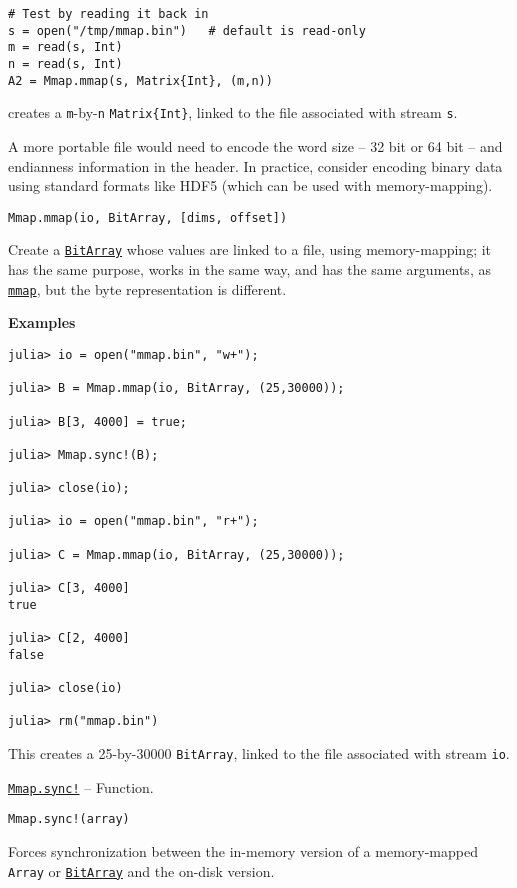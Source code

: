 \begin{adjustwidth}{2em}{0pt}
\begin{verbatim}
# Test by reading it back in
s = open("/tmp/mmap.bin")   # default is read-only
m = read(s, Int)
n = read(s, Int)
A2 = Mmap.mmap(s, Matrix{Int}, (m,n))
\end{verbatim}

creates a \texttt{m}-by-\texttt{n} \texttt{Matrix\{Int\}}, linked to the file associated with stream \texttt{s}.

A more portable file would need to encode the word size – 32 bit or 64 bit – and endianness information in the header. In practice, consider encoding binary data using standard formats like HDF5 (which can be used with memory-mapping).




\begin{lstlisting}
Mmap.mmap(io, BitArray, [dims, offset])
\end{lstlisting}

Create a \hyperlink{18015155802543401629}{\texttt{BitArray}} whose values are linked to a file, using memory-mapping; it has the same purpose, works in the same way, and has the same arguments, as \hyperlink{1028440884226576897}{\texttt{mmap}}, but the byte representation is different.

\textbf{Examples}


\begin{verbatim}
julia> io = open("mmap.bin", "w+");

julia> B = Mmap.mmap(io, BitArray, (25,30000));

julia> B[3, 4000] = true;

julia> Mmap.sync!(B);

julia> close(io);

julia> io = open("mmap.bin", "r+");

julia> C = Mmap.mmap(io, BitArray, (25,30000));

julia> C[3, 4000]
true

julia> C[2, 4000]
false

julia> close(io)

julia> rm("mmap.bin")
\end{verbatim}

This creates a 25-by-30000 \texttt{BitArray}, linked to the file associated with stream \texttt{io}.



\end{adjustwidth}
\hypertarget{10364432000624675045}{} 
\hyperlink{10364432000624675045}{\texttt{Mmap.sync!}}  -- {Function.}

\begin{adjustwidth}{2em}{0pt}


\begin{verbatim}
Mmap.sync!(array)
\end{verbatim}

Forces synchronization between the in-memory version of a memory-mapped \texttt{Array} or \hyperlink{18015155802543401629}{\texttt{BitArray}} and the on-disk version.



\end{adjustwidth}

